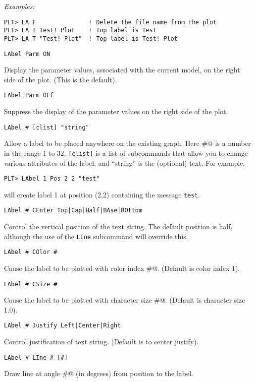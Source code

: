 \medskip\noindent
{\em Examples:}
\begin{verbatim}
PLT> LA F               ! Delete the file name from the plot
PLT> LA T Test! Plot    ! Top label is Test
PLT> LA T "Test! Plot"  ! Top label is Test! Plot
\end{verbatim}
\medskip\begin{verbatim}
LAbel Parm ON
\end{verbatim}
   Display the parameter values, associated with the current model,
on the right side of the plot. (This is the default).

\medskip
\begin{verbatim}
LAbel Parm OFf
\end{verbatim}
   Suppress the display of the parameter values on the right side
of the plot.
\medskip\begin{verbatim}
LAbel # [clist] "string"
\end{verbatim}
   Allow a label to be placed anywhere on the existing graph.  Here \verb@#@ is
a number in the range 1 to 32, {\tt [clist]} is a list of subcommands that
allow you to change various attributes of the label, and ``string''
is the (optional) text.  For example,
\begin{verbatim}
PLT> LAbel 1 Pos 2 2 "test"
\end{verbatim}
will create label 1 at position (2,2) containing the message {\tt test}.
\medskip\begin{verbatim}
LAbel # CEnter Top|Cap|Half|BAse|BOttom
\end{verbatim}
   Control the vertical position of the text string.  The default
position is half, although the use of the {\tt LIne} subcommand will
override this.
\medskip\begin{verbatim}
LAbel # COlor #
\end{verbatim}
   Cause the label to be plotted with color index \verb@#@.  (Default is color
index 1).
\medskip\begin{verbatim}
LAbel # CSize #
\end{verbatim}
   Cause the label to be plotted with character size \verb@#@.  (Default is
character size 1.0).
\medskip\begin{verbatim}
LAbel # Justify Left|Center|Right
\end{verbatim}
   Control justification of text string. (Default is to center justify).
\medskip\begin{verbatim}
LAbel # LIne # [#]
\end{verbatim}
   Draw line at angle \verb@#@ (in degrees) from position to the label.
